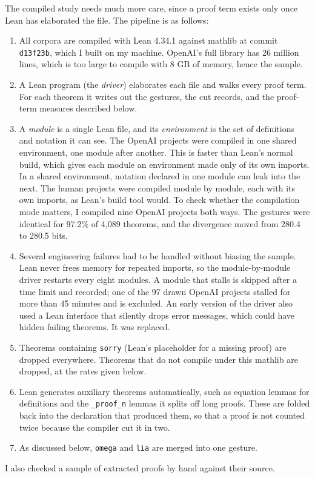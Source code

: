 \documentclass{article}
\begin{document}
The compiled study needs much more care, since a proof term exists only once Lean has elaborated the file. The
pipeline is as follows:
\begin{enumerate}
    \item
    All corpora are compiled with Lean 4.34.1 against mathlib at commit \texttt{d13f23b}, which I built on my machine.
    OpenAI's full library has 26 million lines, which is too large to compile with 8 GB of memory, hence the sample.
    \item
    A Lean program (the \textit{driver}) elaborates each file and walks every proof term. For each theorem it writes
    out the gestures, the cut records, and the proof-term measures described below.
    \item
    A \textit{module} is a single Lean file, and its \textit{environment} is the set of definitions and notation it
    can see. The OpenAI projects were compiled in one shared environment, one module after another. This is faster than
    Lean's normal build, which gives each module an environment made only of its own imports. In a shared environment,
    notation declared in one module can leak into the next. The human projects were compiled module by module, each
    with its own imports, as Lean's build tool would. To check whether the
    compilation mode matters, I compiled nine OpenAI projects both ways. The gestures were identical for 97.2\% of 4,089
    theorems, and the divergence moved from 280.4 to 280.5 bits.
    \item
    Several engineering failures had to be handled without biasing the sample. Lean never frees memory for repeated
    imports, so the module-by-module driver restarts every eight modules. A module that stalls is skipped after a time
    limit and recorded; one of the 97 drawn OpenAI projects stalled for more than 45 minutes and is excluded. An early
    version of the driver also used a Lean interface that silently drops error messages, which could have hidden
    failing theorems. It was replaced.
    \item
    Theorems containing \texttt{sorry} (Lean's placeholder for a missing proof) are dropped everywhere. Theorems that do
    not compile under this mathlib are dropped, at the rates given below.
    \item
    Lean generates auxiliary theorems automatically, such as equation lemmas for definitions and the
    \texttt{\_proof\_n} lemmas it splits off long proofs. These are folded back into the declaration that produced them,
    so that a proof is not counted twice because the compiler cut it in two.
    \item
    As discussed below, \texttt{omega} and \texttt{lia} are merged into one gesture.
\end{enumerate}
I also checked a sample of extracted proofs by hand against their source.
\end{document}
